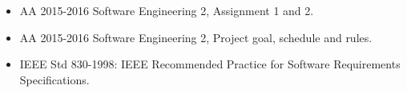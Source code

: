 \begin{itemize}
    \item AA 2015-2016 Software Engineering 2, Assignment 1 and 2.
    \item AA 2015-2016 Software Engineering 2, Project goal, schedule and rules.
    \item IEEE Std 830-1998: IEEE Recommended Practice for Software Requirements Specifications.
\end{itemize}